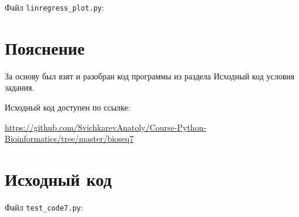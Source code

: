 \documentclass{article} %
\begin{document}
Файл \verb$linregress_plot.py$:


\section{Пояснение}
За основу был взят и разобран код программы из раздела Исходный код условия задания.

Исходный код доступен по ссылке:

\href{https://github.com/SvichkarevAnatoly/Course-Python-Bioinformatics/tree/master/bioseq7}{https://github.com/SvichkarevAnatoly/Course-Python-Bioinformatics/tree/master/bioseq7}

\section{Исходный код}
Файл \verb$test_code7.py$:

\end{document}
